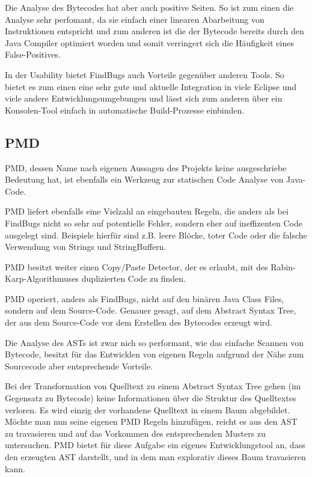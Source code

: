 Die Analyse des Bytecodes hat aber auch positive Seiten. So ist zum einen die Analyse sehr perfomant, da sie einfach einer linearen Abarbeitung von Instruktionen entspricht und zum anderen ist die der Bytecode bereits durch den Java Compiler optimiert worden und somit verringert sich die Häufigkeit eines False-Positives.

In der Usability bietet FindBugs auch Vorteile gegenüber anderen Tools. So bietet es zum einen eine sehr gute und aktuelle Integration in viele Eclipse und viele andere Entwicklungsumgebungen und lässt sich zum anderen über ein Konsolen-Tool einfach in automatische Build-Prozesse einbinden.


\subsection{PMD}
PMD, dessen Name nach eigenen Aussagen des Projekts keine ausgeschriebe Bedeutung hat, ist ebenfalls ein Werkzeug zur statischen Code Analyse von Java-Code. 

PMD liefert ebenfalls eine Vielzahl an eingebauten Regeln, die anders als bei FindBugs nicht so sehr auf potentielle Fehler, sondern eher auf ineffizenten Code ausgelegt sind. Beispiele hierfür sind z.B. leere Blöcke, toter Code oder die falsche Verwendung von Strings und StringBuffern. 

PMD besitzt weiter einen Copy/Paste Detector, der es erlaubt, mit des Rabin-Karp-Algorithmuses duplizierten Code zu finden.

PMD operiert, anders als FindBugs, nicht auf den binären Java Class Files, sondern auf dem Source-Code. Genauer gesagt, auf dem Abstract Syntax Tree, der aus dem Source-Code vor dem Erstellen des Bytecodes erzeugt wird. 

Die Analyse des ASTs ist zwar nich so performant, wie das einfache Scannen von Bytecode, besitzt für das Entwicklen von eigenen Regeln aufgrund der Nähe zum Sourcecode aber entsprechende Vorteile.

Bei der Transformation von Quelltext zu einem Abstract Syntax Tree gehen (im Gegensatz zu Bytecode) keine Informationen über die Struktur des Quelltextes verloren. Es wird einzig der vorhandene Quelltext in einem Baum abgebildet. 
Möchte man nun seine eigenen PMD Regeln hinzufügen, reicht es aus den AST zu travasieren und auf das Vorkommen des entsprechenden Musters zu untersuchen. PMD bietet für diese Aufgabe ein eigenes Entwicklungstool an, dass den erzeugten AST darstellt, und in dem man explorativ dieses Baum travasieren kann.


